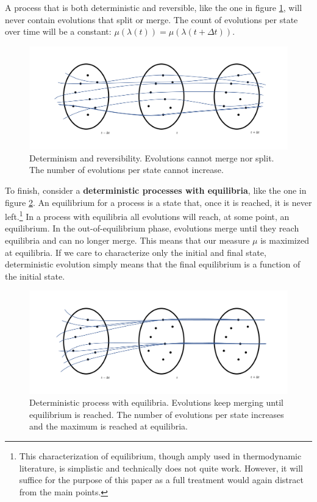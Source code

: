 \documentclass[letterpaper,twocolumn]{article}
\begin{document}
A process that is both deterministic and reversible, like the one in figure \ref{fig_detrev}, will never contain evolutions that split or merge. The count of evolutions per state over time will be a constant: $\mu(\lambda(t)) = \mu(\lambda(t + \Delta t))$.

\begin{figure}[h!]
	\includegraphics[width=\columnwidth]{images/Slide5.png}
	\caption{Determinism and reversibility. Evolutions cannot merge nor split. The number of evolutions per state cannot increase.} \label{fig_detrev}
\end{figure}


To finish, consider a \textbf{deterministic processes with equilibria}, like the one in figure \ref{fig_with_equilibria}. An equilibrium for a process is a state that, once it is reached, it is never left.\footnote{This characterization of equilibrium, though amply used in thermodynamic literature, is simplistic and technically does not quite work. However, it will suffice for the purpose of this paper as a full treatment would again distract from the main points.} In a process with equilibria all evolutions will reach, at some point, an equilibrium. In the out-of-equilibrium phase, evolutions merge until they reach equilibria and can no longer merge. This means that our measure $\mu$ is maximized at equilibria. If we care to characterize only the initial and final state, deterministic evolution simply means that the final equilibrium is a function of the initial state.

\begin{figure}[h]
	\includegraphics[width=\columnwidth]{images/Slide6.png}
	\caption{Deterministic process with equilibria. Evolutions keep merging until equilibrium is reached. The number of evolutions per state increases and the maximum is reached at equilibria.}\label{fig_with_equilibria}
\end{figure}
\end{document}
